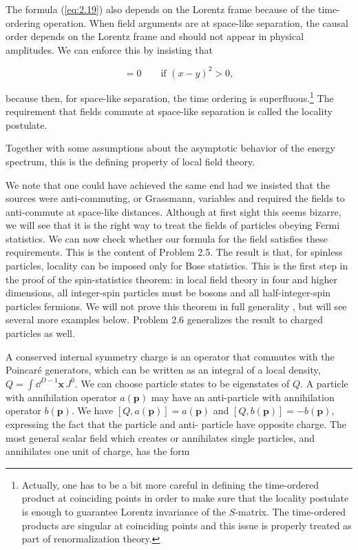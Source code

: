 The formula (\ref{eq:2.19}) also depends on the Lorentz frame because of the time-ordering
operation. When field arguments are at space-like separation, the causal order depends
on the Lorentz frame and should not appear in physical amplitudes. We can enforce
this by insisting that

\begin{equation}
[\phi(x),\phi(y)]=0\qquad\text{if }(x-y)^2>0,
\label{eq:2.20}
\end{equation}

because then, for space-like separation, the time ordering is superfluous.\footnote[4]{Actually, one has to be a bit more careful in defining the time-ordered product at coinciding points in order to make sure that the locality postulate is enough to guarantee Lorentz invariance of the $S$-matrix. The time-ordered products are singular at coinciding points and this issue is properly treated as part of renormalization theory.} The requirement that fields commute at space-like separation is called the locality postulate.

Together with some assumptions about the asymptotic behavior of the energy spectrum,
this is the defining property of local field theory.

We note that one could have achieved the same end had we insisted that the sources
were anti-commuting, or Grassmann, variables and required the fields to anti-commute
at space-like distances. Although at first sight this seems bizarre, we will see that it is
the right way to treat the fields of particles obeying Fermi statistics. We can now check
whether our formula for the field satisfies these requirements. This is the content of
Problem 2.5. The result is that, for spinless particles, locality can be imposed only for
Bose statistics. This is the first step in the proof of the spin-statistics theorem: in local
field theory in four and higher dimensions, all integer-spin particles must be bosons and
all half-integer-spin particles fermions. We will not prove this theorem in full generality
\cite{banks-ref-6,banks-ref-7,banks-ref-8}, but will see several more examples below. Problem 2.6 generalizes the result to
charged particles as well.

A conserved internal symmetry charge is an operator that commutes with the
Poincaré generators, which can be written as an integral of a local density, $Q=\int\dd^{D-1}\mathbf x\,J^0$.
We can choose particle states to be eigenstates of $Q$. A particle with annihilation
operator $a(\mathbf p)$ may have an anti-particle with annihilation operator $b(\mathbf p)$. We have
$[Q,a(\mathbf p)]=a(\mathbf p)$ and $[Q,b(\mathbf p)]=-b(\mathbf p)$, expressing the fact that the particle and anti-
particle have opposite charge. The most general scalar field which creates or annihilates
single particles, and annihilates one unit of charge, has the form

